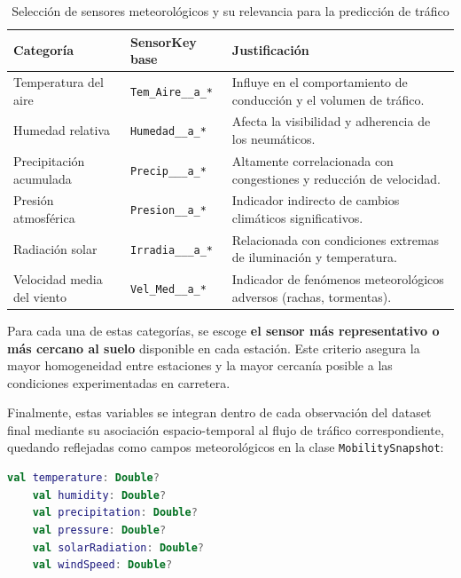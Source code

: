 \begin{table}[H]
	\centering
	\caption{Selección de sensores meteorológicos y su relevancia para la predicción de tráfico}
	\label{tab:seleccion_meteo}
	\renewcommand{\arraystretch}{1.3}
	\begin{tabularx}{\textwidth}{l l X}
		\toprule
		\textbf{Categoría} & \textbf{SensorKey base} & \textbf{Justificación} \\
		\midrule
		Temperatura del aire & \texttt{Tem\_Aire\_\_a\_*} & Influye en el comportamiento de conducción y el volumen de tráfico. \\
		Humedad relativa & \texttt{Humedad\_\_a\_*} & Afecta la visibilidad y adherencia de los neumáticos. \\
		Precipitación acumulada & \texttt{Precip\_\_\_a\_*} & Altamente correlacionada con congestiones y reducción de velocidad. \\
		Presión atmosférica & \texttt{Presion\_\_a\_*} & Indicador indirecto de cambios climáticos significativos. \\
		Radiación solar & \texttt{Irradia\_\_\_a\_*} & Relacionada con condiciones extremas de iluminación y temperatura. \\
		Velocidad media del viento & \texttt{Vel\_Med\_\_a\_*} & Indicador de fenómenos meteorológicos adversos (rachas, tormentas). \\
		\bottomrule
	\end{tabularx}
\end{table}

\vspace{1em}
Para cada una de estas categorías, se escoge \textbf{el sensor más representativo o más cercano al suelo} disponible en cada estación. Este criterio asegura la mayor homogeneidad entre estaciones y la mayor cercanía posible a las condiciones experimentadas en carretera.

Finalmente, estas variables se integran dentro de cada observación del dataset final mediante su asociación espacio-temporal al flujo de tráfico correspondiente, quedando reflejadas como campos meteorológicos en la clase \texttt{MobilitySnapshot}:

\begin{lstlisting}[language=Kotlin, caption={Variables meteorológicas integradas en MobilitySnapshot}]
	val temperature: Double?
	val humidity: Double?
	val precipitation: Double?
	val pressure: Double?
	val solarRadiation: Double?
	val windSpeed: Double?
\end{lstlisting}

